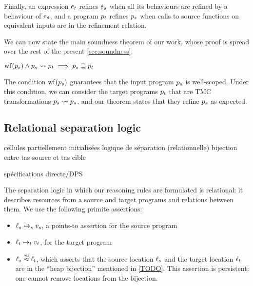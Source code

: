 Finally, an expression $\datalangExpr_t$ refines $\datalangExpr_s$ when all its behaviours are refined by a behaviour of $\datalangExpr_s$, and a program $\datalangProg_t$ refines $\datalangProg_s$ when calls to source functions on equivalent inputs are in the refinement relation.

We can now state the main soundness theorem of our work, whose proof is spread over the rest of the present \cref{sec:soundness}.

\begin{theorem}[Soundness]
    $
        \wf{\datalangProg_s} \wedge \datalangProg_s \tmc \datalangProg_t \implies
        \datalangProg_s \refined \datalangProg_t
    $
\end{theorem}

The condition $\wf{\datalangProg_s}$ guarantees that the input program $\datalangProg_s$ is well-scoped. Under this condition, we can consider the target programs $\datalangProg_t$ that are TMC transformations $\datalangProg_s \tmc \datalangProg_s$, and our theorem states that they refine $\datalangProg_s$ as expected.




\subsection{Relational separation logic}

cellules partiellement initialisées
logique de séparation (relationnelle)
bijection entre tas source et tas cible

spécifications directe/DPS


The separation logic in which our reasoning rules are formulated is relational: it describes resources from a source and target programs and relations between them. We use the following primite assertions:

\begin{itemize}
\item $\datalangLoc_s \iPointsto_s \datalangVal_s$, a points-to assertion for the source program
\item $\datalangLoc_t \iPointsto_t \datalangVal_t$, for the target program
\item $\datalangLoc_s \iInBij \datalangLoc_t$, which asserts that the source location
  $\datalangLoc_s$ and the target location $\datalangLoc_t$ are in the ``heap
  bijection'' mentioned in \cref{TODO}. This assertion is
  persistent: one cannot remove locations from the bijection.
\end{itemize}


